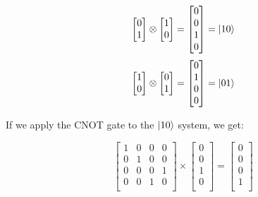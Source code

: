 \documentclass{article}
\begin{document}
\[
	\begin{bmatrix}
		0 \\
		1 \\
	\end{bmatrix}
	\otimes
	\begin{bmatrix}
		1 \\
		0 \\
	\end{bmatrix}
	=
	\begin{bmatrix}
		0 \\
		0 \\
		1 \\
		0 \\
	\end{bmatrix}
	=
	\ket{10}
\]
\[
	\begin{bmatrix}
		1 \\
		0 \\
	\end{bmatrix}
	\otimes
	\begin{bmatrix}
		0 \\
		1 \\
	\end{bmatrix}
	=
	\begin{bmatrix}
		0 \\
		1 \\
		0 \\
		0 \\
	\end{bmatrix}
	=
	\ket{01}
\]

If we apply the CNOT gate to the $\ket{10}$ system, we get:

\[
	\begin{bmatrix}
		1 & 0 & 0 & 0 \\
		0 & 1 & 0 & 0 \\
		0 & 0 & 0 & 1 \\
		0 & 0 & 1 & 0 \\
	\end{bmatrix}
	\times
	\begin{bmatrix}
		0 \\
		0 \\
		1 \\
		0 \\
	\end{bmatrix}
	=
	\begin{bmatrix}
		0 \\
		0 \\
		0 \\
		1 \\
	\end{bmatrix}
\]
\end{document}
